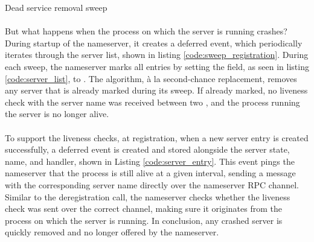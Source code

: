 \begin{mdframed}[style=algorithm]
\begin{algorithm}[H]
 \caption{Dead service removal sweep}
 \label{alg:dead_service_sweep}
\end{algorithm}
\end{mdframed}



\paragraph{}
But what happens when the process on which the server is running crashes? During startup of the nameserver, it creates a deferred event, which periodically iterates through the server list, shown in listing \ref{code:sweep_registration}. During each sweep, the nameserver marks all entries by setting the  field, as seen in listing \ref{code:server_list}, to . The algorithm,  \`a la second-chance replacement, removes any server that is already marked during its sweep. If already marked, no liveness check with the server name was received between two , and the process running the server is no longer alive.


\paragraph{}
To support the liveness checks, at registration, when a new server entry is created successfully, a deferred event is created and stored alongside the server state, name, and handler, shown in Listing \ref{code:server_entry}. This event pings the nameserver that the process is still alive at a given interval, sending a  message with the corresponding server name directly over the nameserver RPC channel. Similar to the deregistration call, the nameserver checks whether the liveness check was sent over the correct channel, making sure it originates from the process on which the server is running. In conclusion, any crashed server is quickly removed and no longer offered by the nameserver. 





